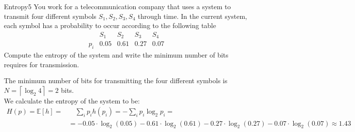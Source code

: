 \newif\ifvimbug
\vimbugfalse

\ifvimbug



\fi

 

\begin{questions}



\begin{question}{Entropy}{5}
You work for a telecommunication company that uses a system to transmit four different symbols ${S_1, S_2, S_3, S_4}$ through time. 
In the current system, each symbol has a probability to occur according to the following table 
\begin{equation*}
\begin{array}{c|c|c|c|c}
 & S_1 & S_2 & S_3 & S_4 \\
\hline
p_i & 0.05    & 0.61    & 0.27    & 0.07
\end{array}
\end{equation*}
Compute the entropy of the system and write the minimum number of bits requires for transmission.
\begin{answer}
The minimum number of bits for transmitting the four different symbols is $N = \left\lceil\log _{2} 4\right\rceil = 2$ bits.\\
We calculate the entropy of the system to be:
\begin{equation*}
\begin{split}
H(p)=\mathbb{E}[h]=
& \quad \sum_{i} p_{i} h(p_{i})=-\sum_{i} p_{i} \log _{2} p_{i} = \\
& = - 0.05\cdot \log _{2}(0.05)  - 0.61\cdot \log _{2}(0.61)  - 0.27\cdot \log _{2}(0.27) - 0.07\cdot \log _{2}(0.07) \approx 1.43
\end{split}
\end{equation*}
\end{answer}

\end{question}



\end{questions}
